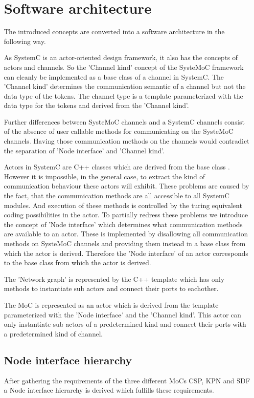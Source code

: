 \section{Software architecture}
The introduced concepts are converted into a software architecture in the following way.

As SystemC is an actor-oriented design framework, it also has the concepts of actors
and channels. So the 'Channel kind' concept of the SysteMoC framework can cleanly be implemented
as a base class of a channel in SystemC. The 'Channel kind' determines the
communication semantic of a channel but not the data type of the tokens.
The channel type is a template parameterized with the data type for the tokens and
derived from the 'Channel kind'.

Further differences between SysteMoC channels and a SystemC channels consist of the
absence of user callable methods for communicating on the SysteMoC channels.
Having those communication methods on the channels would contradict the separation
of 'Node interface' and 'Channel kind'.

Actors in SystemC are C++ classes which are derived from the base class .
However it is impossible, in the general case, to extract the kind of communication
behaviour these actors will exhibit. These problems are caused by the fact, that the
communication methods are all accessible to all SystemC modules. And execution
of these methods is controlled by the turing equivalent coding possibilities in the actor.
To partially redress these problems we introduce the concept of 'Node interface' which
determines what communication methods are available to an actor. These is implemented
by disallowing all communication methods on SysteMoC channels and providing them instead
in a base class from which the actor is derived. Therefore the 'Node interface' of an actor
corresponds to the base class from which the actor is derived.

The 'Network graph' is represented by the C++ template  
which has only methods to instantiate sub actors and connect their ports to eachother.

The MoC is represented as an actor which is derived from the 
template parameterized with the 'Node interface' and the 'Channel kind'. This actor can only
instantiate sub actors of a predetermined kind and connect their ports with a  predetermined
kind of channel.

\subsection{Node interface hierarchy}
After gathering the requirements of the three different MoCs CSP, KPN
and SDF a Node interface hierarchy is derived which fulfills these requirements.

